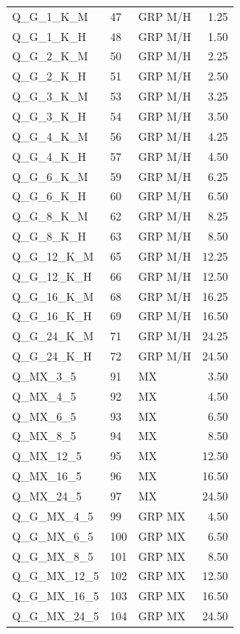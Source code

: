 \begin{longtable}{@{}lllr@{}}
Q\_G\_1\_K\_M & 47 & GRP M/H & 1.25\\
Q\_G\_1\_K\_H & 48 & GRP M/H & 1.50\\
Q\_G\_2\_K\_M & 50 & GRP M/H & 2.25\\
Q\_G\_2\_K\_H & 51 & GRP M/H & 2.50\\
Q\_G\_3\_K\_M & 53 & GRP M/H & 3.25\\
Q\_G\_3\_K\_H & 54 & GRP M/H & 3.50\\
Q\_G\_4\_K\_M & 56 & GRP M/H & 4.25\\
Q\_G\_4\_K\_H & 57 & GRP M/H & 4.50\\
Q\_G\_6\_K\_M & 59 & GRP M/H & 6.25\\
Q\_G\_6\_K\_H & 60 & GRP M/H & 6.50\\
Q\_G\_8\_K\_M & 62 & GRP M/H & 8.25\\
Q\_G\_8\_K\_H & 63 & GRP M/H & 8.50\\
Q\_G\_12\_K\_M & 65 & GRP M/H & 12.25\\
Q\_G\_12\_K\_H & 66 & GRP M/H & 12.50\\
Q\_G\_16\_K\_M & 68 & GRP M/H & 16.25\\
Q\_G\_16\_K\_H & 69 & GRP M/H & 16.50\\
Q\_G\_24\_K\_M & 71 & GRP M/H & 24.25\\
Q\_G\_24\_K\_H & 72 & GRP M/H & 24.50\\
Q\_MX\_3\_5 & 91 & MX & 3.50\\
Q\_MX\_4\_5 & 92 & MX & 4.50\\
Q\_MX\_6\_5 & 93 & MX & 6.50\\
Q\_MX\_8\_5 & 94 & MX & 8.50\\
Q\_MX\_12\_5 & 95 & MX & 12.50\\
Q\_MX\_16\_5 & 96 & MX & 16.50\\
Q\_MX\_24\_5 & 97 & MX & 24.50\\
Q\_G\_MX\_4\_5 & 99 & GRP MX & 4.50\\
Q\_G\_MX\_6\_5 & 100 & GRP MX & 6.50\\
Q\_G\_MX\_8\_5 & 101 & GRP MX & 8.50\\
Q\_G\_MX\_12\_5 & 102 & GRP MX & 12.50\\
Q\_G\_MX\_16\_5 & 103 & GRP MX & 16.50\\
Q\_G\_MX\_24\_5 & 104 & GRP MX & 24.50\\
\bottomrule
\end{longtable}

